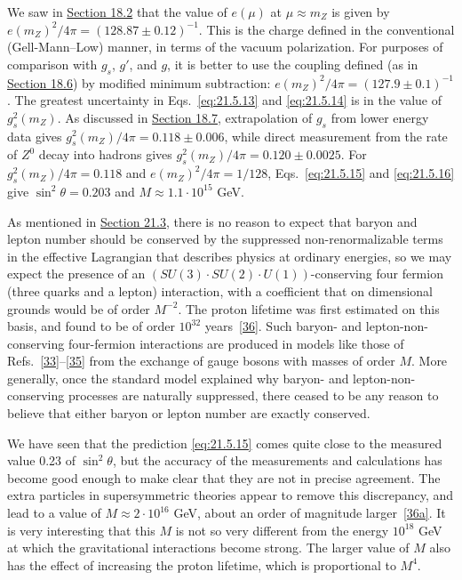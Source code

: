 We saw in \hyperref[sec:18.2]{Section 18.2} that the value of $e(\mu)$ at $\mu\approx m_Z$ is given by $e(m_Z)^2/4\pi=(128.87\pm0.12)^{-1}$. This is the charge defined in the conventional (Gell-Mann--Low) manner, in terms of the vacuum polarization. For purposes of comparison with $g_s$, $g'$, and $g$, it is better to use the coupling defined (as in \hyperref[sec:18.6]{Section 18.6}) by modified minimum subtraction: $e(m_Z)^2/4\pi=(127.9\pm0.1)^{-1}$. The greatest uncertainty in Eqs.~\eqref{eq:21.5.13} and \eqref{eq:21.5.14} is in the value of $g_s^2(m_Z)$. As discussed in \hyperref[sec:18.7]{Section 18.7}, extrapolation of $g_s$ from lower energy data gives $g_s^2(m_Z)/4\pi=0.118\pm0.006$, while direct measurement from the rate of $Z^0$ decay into hadrons gives $g_s^2(m_Z)/4\pi=0.120\pm0.0025$. For $g_s^2(m_Z)/4\pi=0.118$ and $e(m_Z)^2/4\pi=1/128$, Eqs.~\eqref{eq:21.5.15} and \eqref{eq:21.5.16} give $\sin^2\theta=0.203$ and $M\approx1.1\cdot10^{15}$ GeV.

As mentioned in \hyperref[sec:21.3]{Section 21.3}, there is no reason to expect that baryon and lepton number should be conserved by the suppressed non-renormalizable terms in the effective Lagrangian that describes physics at ordinary energies, so we may expect the presence of an $(SU(3)\cdot SU(2)\cdot U(1))$-conserving four fermion (three quarks and a lepton) interaction, with a coefficient that on dimensional grounds would be of order $M^{-2}$. The proton lifetime was first estimated on this basis, and found to be of order $10^{32}$ years~\hyperref[ch21-ref-36]{[36]}. Such baryon- and lepton-non-conserving four-fermion interactions are produced in models like those of Refs.~\hyperref[ch21-ref-33]{[33]}--\hyperref[ch21-ref-35]{[35]} from the exchange of gauge bosons with masses of order $M$. More generally, once the standard model explained why baryon- and lepton-non-conserving processes are naturally suppressed, there ceased to be any reason to believe that either baryon or lepton number are exactly conserved.

We have seen that the prediction \eqref{eq:21.5.15} comes quite close to the measured value 0.23 of $\sin^2\theta$, but the accuracy of the measurements and calculations has become good enough to make clear that they are not in precise agreement. The extra particles in supersymmetric theories appear to remove this discrepancy, and lead to a value of $M\approx2\cdot10^{16}$ GeV, about an order of magnitude larger~\hyperref[ch21-ref-36a]{[36a]}. It is very interesting that this $M$ is not so very different from the energy $10^{18}$ GeV at which the gravitational interactions become strong. The larger value of $M$ also has the effect of increasing the proton lifetime, which is proportional to $M^4$.
